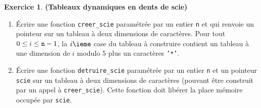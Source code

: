 \documentclass[12pt]{article}
\theoremstyle{definition}
\newtheorem{Exercice}{Exercice}
\begin{document}
\begin{Exercice} {\bf (Tableaux dynamiques en dents de scie)}\smallskip

\begin{enumerate}
    \item Écrire une fonction {\tt creer\_scie} paramétrée par un entier
    {\tt n} et qui renvoie un pointeur sur un tableau à deux dimensions
    de caractères. Pour tout $0 \leq i \leq {\tt n} - 1$, la $i\ieme$
    case du tableau à construire contient un tableau à une dimension de
    $i$ modulo $5$ plus un caractères {\tt '*'}.
    \smallskip

    \item Écrire une fonction {\tt detruire\_scie} paramétrée par un
    entier {\tt n} et un pointeur {\tt scie} sur un tableau à deux
    dimensions de caractères (pouvant être construit par un appel à
    {\tt creer\_scie}). Cette fonction doit libérer la place mémoire
    occupée par {\tt scie}.
\end{enumerate}
\end{Exercice}
\bigskip
\end{document}
